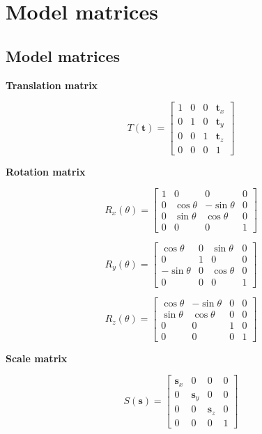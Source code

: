 \chapter{Model matrices}
\label{sec:matrices}
\section{Model matrices}

\textbf{Translation matrix}

$$T(\mathbf{t}) = \left[\begin{array}{cccc}
1 & 0 & 0 & \mathbf{t}_x       \\
0 & 1 & 0 & \mathbf{t}_y       \\
0 & 0 & 1 & \mathbf{t}_z       \\
0 & 0 & 0 & 1
\end{array}\right]$$


\textbf{Rotation matrix}

$$R_x(\theta) = \left[\begin{array}{cccc}
1 & 0 & 0 & 0       \\
0 & \cos\theta & -\sin\theta & 0       \\
0 & \sin\theta & \cos\theta & 0      \\
0 & 0 & 0 & 1
\end{array}\right]$$

$$R_y(\theta) = \left[\begin{array}{cccc}
\cos\theta & 0 & \sin\theta & 0       \\
0 & 1 & 0 & 0       \\
-\sin\theta & 0 & \cos\theta & 0      \\
0 & 0 & 0 & 1
\end{array}\right]$$

$$R_z(\theta) = \left[\begin{array}{cccc}
\cos\theta & -\sin\theta & 0 & 0       \\
\sin\theta & \cos\theta & 0 & 0       \\
0 & 0 & 1 & 0      \\
0 & 0 & 0 & 1
\end{array}\right]$$

\textbf{Scale matrix}

$$S(\mathbf{s}) = \left[\begin{array}{cccc}
\mathbf{s}_x & 0 & 0 & 0       \\
0 & \mathbf{s}_y & 0 & 0       \\
0 & 0 & \mathbf{s}_z & 0      \\
0 & 0 & 0 & 1
\end{array}\right]$$

